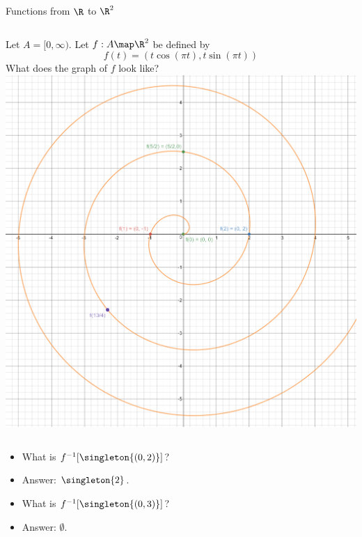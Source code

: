 \documentclass{beamer}
\begin{document}
\begin{frame}{Functions from $\R$ to $\R^2$}

\begin{columns}
\column[T]{5cm}
Let $A=[0, \infty)$. Let $f:A\map \R^2$ be defined by
$$f(t) = (t \cos(\pi t), t \sin(\pi t))$$
What does the graph of $f$ look like?
\column[T]{5cm}
\includegraphics[scale=0.1]{spiral}
\end{columns}

\begin{itemize}
\item What is $f^{-1}[\singleton{(0,2)}]$?
\item Answer: $\singleton{2}$.
\item What is $f^{-1}[\singleton{(0,3)}]$?
\item Answer: $\emptyset$.
\end{itemize}

\end{frame}
\end{document}
